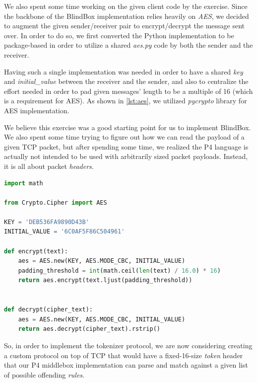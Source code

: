 \documentclass{winslabreport}
\begin{document}
We also spent some time working on the given client code by the exercise. Since the backbone of the BlindBox implementation relies heavily on \emph{AES}, we decided to augment the given sender/receiver pair to encrypt/decrypt the message sent over. In order to do so, we first converted the Python implementation to be package-based in order to utilize a shared \emph{aes.py} code by both the sender and the receiver. 

Having such a single implementation was needed in order to have a shared \emph{key} and \emph{initial\_value} between the receiver and the sender, and also to centralize the effort needed in order to pad given messages' length to be a multiple of 16 (which is a requirement for AES). As shown in \autoref{lst:aes}, we utilized \emph{pycrypto} library for AES implementation.

We believe this exercise was a good starting point for us to implement BlindBox. We also spent some time trying to figure out how we can read the payload of a given TCP packet, but after spending some time, we realized the P4 language is actually not intended to be used with arbitrarily sized packet payloads. Instead, it is all about packet \emph{headers}. 

\begin{lstlisting}[caption={AES Encryption/Decryption},label={lst:aes},language=Python]
import math

from Crypto.Cipher import AES

KEY = 'DEB536FA9890D43B'
INITIAL_VALUE = '6C0AF5F86C504961'

def encrypt(text):
    aes = AES.new(KEY, AES.MODE_CBC, INITIAL_VALUE)
    padding_threshold = int(math.ceil(len(text) / 16.0) * 16)
    return aes.encrypt(text.ljust(padding_threshold))


def decrypt(cipher_text):
    aes = AES.new(KEY, AES.MODE_CBC, INITIAL_VALUE)
    return aes.decrypt(cipher_text).rstrip()
\end{lstlisting}

So, in order to implement the tokenizer protocol, we are now considering creating a custom protocol on top of TCP that would have a fixed-16-size \emph{token} header that our P4 middlebox implementation can parse and match against a given list of possible offending \emph{rules}.



\end{document}
